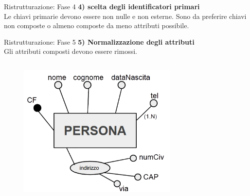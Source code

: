 %
\begin{frame}{Ristrutturazione: Fase 4}
\vspace{-3cm}
\textbf{4) scelta degli identificatori primari}
\\\vspace{2em}
Le chiavi primarie devono essere non nulle e non esterne. Sono da preferire chiavi non composte o almeno composte da meno attributi possibile.
\end{frame}
%
\begin{frame}{Ristrutturazione: Fase 5}
\textbf{5) Normalizzazione degli attributi}
\\\vspace{2em}
Gli attributi composti devono essere rimossi.
\begin{columns}
        \begin{column}{0.5\textwidth}
            \begin{figure}[h]
        \centering
        \includegraphics[width=0.75\textwidth]{img/i10.png}
    \end{figure}
        \end{column}
        \begin{column}{0.5\textwidth}
\end{column}
\end{columns}
\end{frame}
